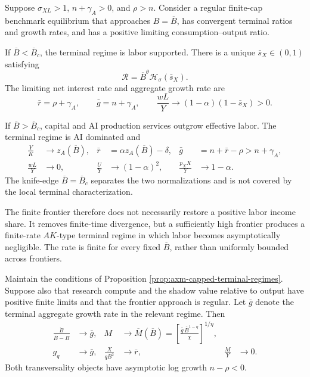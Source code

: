 \begin{proposition}
\label{prop:axm-capped-terminal-regimes}
Suppose \(\sigma_{XL}>1\), \(n+\gamma_A>0\), and \(\rho>n\). Consider a
regular finite-cap benchmark equilibrium that approaches
\(B=\overline B\), has convergent terminal ratios and growth rates, and has a
positive limiting consumption--output ratio.

If \(\overline B<\overline B_c\), the terminal regime is labor supported.
There is a unique \(\bar s_X\in(0,1)\) satisfying
\begin{equation}
 \mathcal R=\overline B^\theta\mathcal H_\sigma(\bar s_X).
 \label{eq:axm-capped-labor-supported-share}
\end{equation}
The limiting net interest rate and aggregate growth rate are
\begin{equation}
 \bar r=\rho+\gamma_A,\qquad
 \bar g=n+\gamma_A,\qquad
 \frac{wL}{Y}\to(1-\alpha)(1-\bar s_X)>0.
 \label{eq:axm-capped-labor-supported-rates}
\end{equation}

If \(\overline B>\overline B_c\), capital and AI production services outgrow
effective labor. The terminal regime is AI dominated and
\begin{align}
 \frac{Y}{K}&\to z_A(\overline B),&
 \bar r&=\alpha z_A(\overline B)-\delta,&
 \bar g&=n+\bar r-\rho>n+\gamma_A,
 \label{eq:axm-capped-ai-growth}\\
 \frac{wL}{Y}&\to0,&
 \frac{U}{Y}&\to(1-\alpha)^2,&
 \frac{p_XX}{Y}&\to1-\alpha.
 \label{eq:axm-capped-ai-shares}
\end{align}
The knife-edge \(\overline B=\overline B_c\) separates the two normalizations
and is not covered by the local terminal characterization.
\end{proposition}

The finite frontier therefore does not necessarily restore a positive labor
income share. It removes finite-time divergence, but a sufficiently high
frontier produces a finite-rate \(AK\)-type terminal regime in which labor
becomes asymptotically negligible. The rate is finite for every fixed
\(\overline B\), rather than uniformly bounded across frontiers.

\begin{proposition}
\label{prop:axm-capped-frontier-research}
Maintain the conditions of Proposition
\ref{prop:axm-capped-terminal-regimes}. Suppose also that research compute and
the shadow value relative to output have positive finite limits and that the
frontier approach is regular. Let \(\bar g\) denote the terminal aggregate
growth rate in the relevant regime. Then
\begin{align}
 \frac{\dot B}{\overline B-B}&\to\bar g,&
 M&\to\overline M(\overline B)
 =\left[
  \frac{\bar g\,\overline B^{1-\eta}}{\chi}
 \right]^{1/\eta},
 \label{eq:axm-capped-terminal-research}\\
 g_q&\to\bar g,&
 \frac{X}{qB^2}&\to\bar r,&
 \frac{M}{Y}&\to0.
 \label{eq:axm-capped-terminal-shadow-value}
\end{align}
Both transversality objects have asymptotic log growth \(n-\rho<0\).
\end{proposition}

